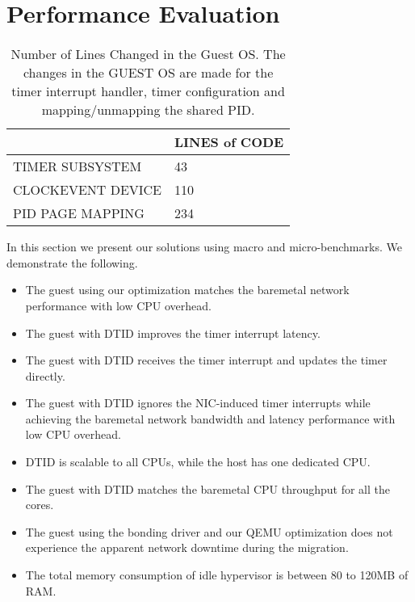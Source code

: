 \section{Performance Evaluation}
\begin{table}[tbp]
\begin{tabular}{|l|l|}
\hline
& LINES of CODE \\ \hline
TIMER SUBSYSTEM & 43 \\ \hline
CLOCKEVENT DEVICE & 110 \\ \hline
PID PAGE MAPPING & 234 \\ \hline
\end{tabular}
\caption{Number of Lines Changed in the Guest OS. The changes
in the GUEST OS are made for the timer interrupt handler,
timer configuration and mapping/unmapping the shared PID.}
\label{tab:guest_os_changes}
\end{table}

In this section we present our solutions using macro
and micro-benchmarks. We demonstrate the following.
\begin{itemize}
  \item The guest using our optimization matches the baremetal
  network performance with low CPU overhead.
  \item The guest with DTID improves the timer interrupt
  latency.
  \item The guest with DTID receives the timer interrupt and
  updates the timer directly.
  \item The guest with DTID ignores the NIC-induced timer
  interrupts while achieving the baremetal network bandwidth
  and latency performance with low CPU overhead.
  \item DTID is scalable to all CPUs, while the host has one
  dedicated CPU.
  \item The guest with DTID matches the baremetal CPU
  throughput for all the cores.
  \item The guest using the bonding driver and our QEMU
  optimization does not experience the apparent network
  downtime during the migration.
  \item The total memory consumption of idle hypervisor is
  between 80 to 120MB of RAM.
\end{itemize}

